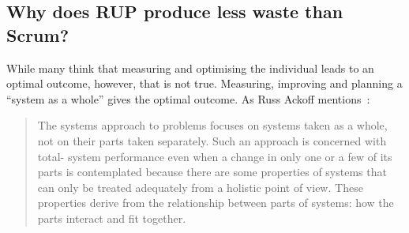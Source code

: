 %
%

\subsection{Why does RUP produce less waste than Scrum?}
While many think that measuring and optimising the individual leads to an optimal outcome, however, that is not true. Measuring, improving and planning a ``system as a whole'' gives the optimal outcome. As Russ Ackoff mentions~\citep{ackoff1971towards}:

\begin{quote}
The systems approach to problems focuses on systems taken as a whole, not on their parts taken separately. Such an approach is concerned with total- system performance even when a change in only one or a few of its parts is contemplated because there are some properties of systems that can only be treated adequately from a holistic point of view. These properties derive from the relationship between parts of systems: how the parts interact and fit together.
\end{quote}

